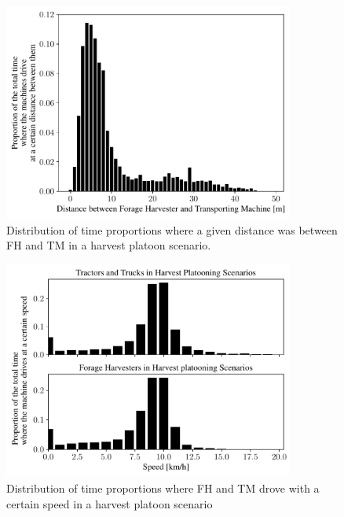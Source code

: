 \documentclass[]{nsm-thesis}
\begin{document}
\begin{figure}%
	\centering
	\includegraphics[width=0.85\textwidth]{figures/distanceHarvestSzenario.pdf}
	\caption{Distribution of time proportions where a given distance was between \ac{FH} and \ac{TM} in a harvest platoon scenario.}%
	\label{fig:distance}%
\end{figure}
\begin{figure}%
	\centering
	\includegraphics[width=0.85\textwidth]{figures/speedHarvestSzenario.pdf}
	\caption{Distribution of time proportions where FH and TM drove with a certain speed in a harvest platoon scenario}%
	\label{fig:speed}%
\end{figure}
\end{document}
